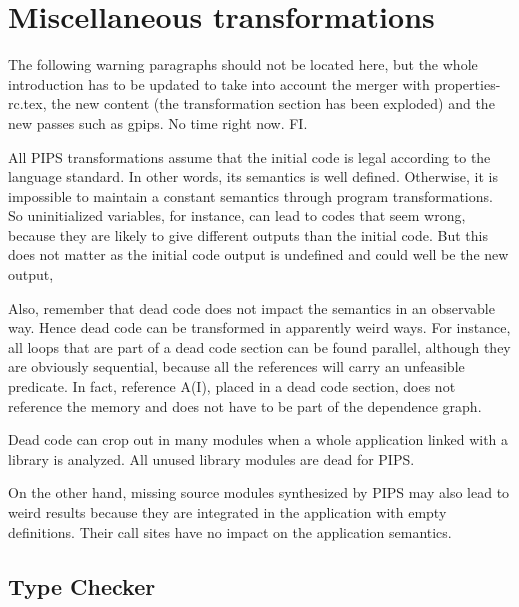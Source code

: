 \documentclass[a4paper]{report}
\begin{document}


\section{Miscellaneous transformations}

The following warning paragraphs should not be located here, but the
whole introduction has to be updated to take into account the merger
with properties-rc.tex, the new content (the transformation section
has been exploded) and the new passes such as gpips. No time right
now. FI.

All PIPS transformations assume that the initial code is legal
according to the language standard. In other words, its semantics is
well defined. Otherwise, it is impossible to maintain a constant
semantics through program transformations. So uninitialized variables,
for instance, can lead to codes that seem wrong, because they are
likely to give different outputs than the initial code. But this does
not matter as the initial code output is undefined and could well be
the new output,

Also, remember that dead code does not impact the semantics in an
observable way. Hence dead code can be transformed in apparently weird
ways. For instance, all loops that are part of a dead code section can
be found parallel, although they are obviously sequential, because all
the references will carry an unfeasible predicate. In fact, reference
A(I), placed in a dead code section, does not reference the memory and
does not have to be part of the dependence graph.

Dead code can crop out in many modules when a whole application linked
with a library is analyzed. All unused library modules are dead for
PIPS.

On the other hand, missing source modules synthesized by PIPS may also
lead to weird results because they are integrated in the application
with empty definitions. Their call sites have no impact on the
application semantics.


\subsection{Type Checker}
\label{subsection-type-checker}
\end{document}
